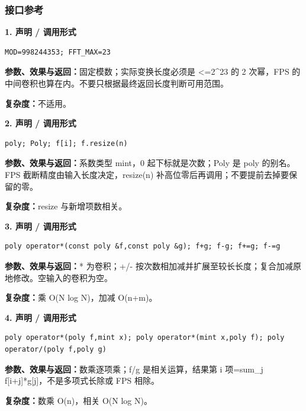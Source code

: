 \documentclass[UTF8,a4paper,10pt]{ctexart}
\begin{document}
\subsubsection*{接口参考}
\noindent\begin{minipage}{\textwidth}
\textbf{1. 声明 / 调用形式}
\begin{lstlisting}
MOD=998244353; FFT_MAX=23
\end{lstlisting}
\textbf{参数、效果与返回：}固定模数；实际变换长度必须是 <=2\textasciicircum{}23 的 2 次幂，FPS 的中间卷积也算在内。不要只根据最终返回长度判断可用范围。

\textbf{复杂度：}不适用。

\end{minipage}\par\vspace{0.4em}
\noindent\begin{minipage}{\textwidth}
\textbf{2. 声明 / 调用形式}
\begin{lstlisting}
poly; Poly; f[i]; f.resize(n)
\end{lstlisting}
\textbf{参数、效果与返回：}系数类型 mint，0 起下标就是次数；Poly 是 poly 的别名。FPS 截断精度由输入长度决定，resize(n) 补高位零后再调用；不要提前去掉要保留的零。

\textbf{复杂度：}resize 与新增项数相关。

\end{minipage}\par\vspace{0.4em}
\noindent\begin{minipage}{\textwidth}
\textbf{3. 声明 / 调用形式}
\begin{lstlisting}
poly operator*(const poly &f,const poly &g); f+g; f-g; f+=g; f-=g
\end{lstlisting}
\textbf{参数、效果与返回：}* 为卷积；+/- 按次数相加减并扩展至较长长度；复合加减原地修改。空输入的卷积为空。

\textbf{复杂度：}乘 O(N log N)，加减 O(n+m)。

\end{minipage}\par\vspace{0.4em}
\noindent\begin{minipage}{\textwidth}
\textbf{4. 声明 / 调用形式}
\begin{lstlisting}
poly operator*(poly f,mint x); poly operator*(mint x,poly f); poly operator/(poly f,poly g)
\end{lstlisting}
\textbf{参数、效果与返回：}数乘逐项乘；f/g 是相关运算，结果第 i 项=sum\_j f[i+j]*g[j]，不是多项式长除或 FPS 相除。

\textbf{复杂度：}数乘 O(n)，相关 O(N log N)。

\end{minipage}\par\vspace{0.4em}
\end{document}
